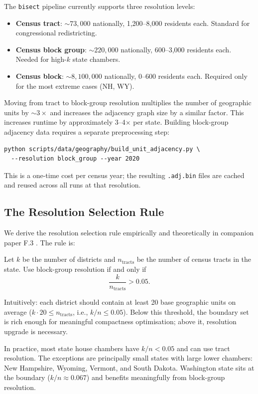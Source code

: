 The \texttt{bisect} pipeline currently supports three resolution levels:
\begin{itemize}
  \item \textbf{Census tract}: $\sim\!73{,}000$ nationally, 1,200--8,000
    residents each. Standard for congressional redistricting.
  \item \textbf{Census block group}: $\sim\!220{,}000$ nationally, 600--3,000
    residents each. Needed for high-$k$ state chambers.
  \item \textbf{Census block}: $\sim\!8{,}100{,}000$ nationally, 0--600
    residents each. Required only for the most extreme cases (NH, WY).
\end{itemize}

Moving from tract to block-group resolution multiplies the number of geographic
units by $\sim\!3\times$ and increases the adjacency graph size by a similar
factor. This increases runtime by approximately 3--4$\times$ per state.
Building block-group adjacency data requires a separate preprocessing step:
\begin{verbatim}
python scripts/data/geography/build_unit_adjacency.py \
  --resolution block_group --year 2020
\end{verbatim}
This is a one-time cost per census year; the resulting \texttt{.adj.bin} files
are cached and reused across all runs at that resolution.

\subsection{The Resolution Selection Rule}
\label{sec:challenges:rule}

We derive the resolution selection rule empirically and theoretically in
companion paper F.3 \citep{dellaLibera2026stateLegResolution}. The rule is:

\begin{definition}
  Let $k$ be the number of districts and $n_{\mathrm{tracts}}$ be the number of
  census tracts in the state. Use block-group resolution if and only if
  \[
    \frac{k}{n_{\mathrm{tracts}}} > 0.05.
  \]
\end{definition}

Intuitively: each district should contain at least 20 base geographic units
on average ($k \cdot 20 \leq n_{\mathrm{tracts}}$, i.e., $k/n \leq 0.05$).
Below this threshold, the boundary set is rich enough for meaningful compactness
optimisation; above it, resolution upgrade is necessary.

In practice, most state house chambers have $k/n < 0.05$ and can use tract
resolution. The exceptions are principally small states with large lower chambers:
New Hampshire, Wyoming, Vermont, and South Dakota. Washington state sits at the
boundary ($k/n \approx 0.067$) and benefits meaningfully from block-group resolution.
